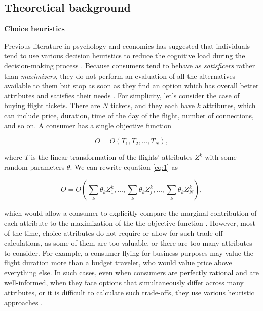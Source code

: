 \documentclass[a4paper,12pt]{article}
\begin{document}
\subsection{Theoretical background}

\textbf{Choice heuristics}

Previous literature in psychology and economics has suggested that individuals tend to use various decision heuristics to reduce the cognitive load during the decision-making process \citep{fishburn74,bettman1979memory,johnson1989choice}. Because consumers tend to behave as \textit{satisficers} rather than \textit{maximizers}, they do not perform an evaluation of all the alternatives available to them but stop as soon as they find an option which has overall better attributes and satisfies their needs \citep{simon1956rational}. For simplicity, let's consider the case of buying flight tickets. There are  $N$ tickets, and they each have $k$ attributes, which can include price, duration, time of the day of the flight, number of connections, and so on. A consumer has a single objective function

\begin{equation} \label{eq:1}
   O = O(T_1, T_2, \dots, T_N), 
\end{equation}

where $T$ is the linear transformation of the flights' attributes $Z^k$ with some random parameters $\theta$. We can rewrite equation \ref{eq:1} as

    \begin{equation} \label{eq:2}
        O = O\left(\sum_{k} \theta_{k}Z_1^k, \dots,\sum_{k} \theta_{k}Z_j^k, \dots, \sum_{k} \theta_{k}Z_N^k\right),
    \end{equation}

which would allow a consumer to explicitly compare the marginal contribution of each attribute to the maximization of the the objective function \citep{de2011modelling}. However, most of the time, choice attributes do not require or allow for such trade-off calculations, as some of them are too valuable, or there are too many attributes to consider. For example, a consumer flying for business purposes may value the flight duration more than a budget traveler, who would value price above everything else. In such cases, even when consumers are perfectly rational and are well-informed, when they face options that simultaneously differ across many attributes, or it is difficult to calculate such trade-offs, they use various heuristic approaches \citep{hauser1990evaluation}.
\end{document}
